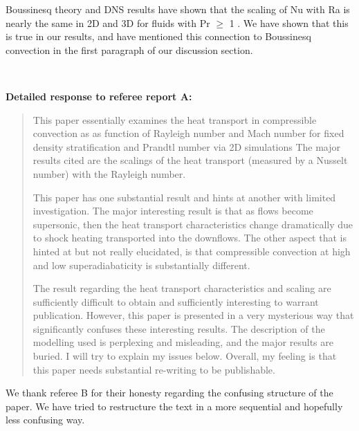 \documentclass[aps, 11pt, singlecolumn]{revtex4-1} %
\begin{document}
\begin{singlespace}
Boussinesq theory and DNS results have shown that the scaling of Nu with Ra
is nearly the same in 2D and 3D for fluids with Pr $\geq$ 1 \cite{ahlers&all2009}.
We have shown that this is true in our results, and have mentioned this connection
to Boussinesq convection in the first paragraph of our discussion section.





$\,$
\newline
$\,$
\newline

\textbf{Detailed response to referee report A:}

\begin{quotation}
This paper essentially examines the heat transport in compressible
convection as as function of Rayleigh number and Mach number for fixed
density stratification and Prandtl number via 2D simulations The major
results cited are the scalings of the heat transport (measured by a
Nusselt number) with the Rayleigh number.

This paper has one substantial result and hints at another with
limited investigation. The major interesting result is that as flows
become supersonic, then the heat transport characteristics change
dramatically due to shock heating transported into the downflows. The
other aspect that is hinted at but not really elucidated, is that
compressible convection at high and low superadiabaticity is
substantially different.

The result regarding the heat transport characteristics and scaling
are sufficiently difficult to obtain and sufficiently interesting to
warrant publication. However, this paper is presented in a very
mysterious way that significantly confuses these interesting results.
The description of the modelling used is perplexing and misleading,
and the major results are buried. I will try to explain my issues
below. Overall, my feeling is that this paper needs substantial
re-writing to be publishable.
\end{quotation}
We thank referee B for their honesty regarding the confusing
structure of the paper.  We have tried to restructure the text in
a more sequential and hopefully less confusing way.


\end{singlespace}
\end{document}
